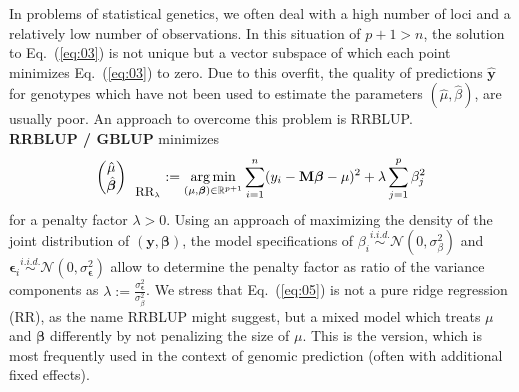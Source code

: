 \documentclass{bmcart}
\newcommand{\bb}{\bm{\beta}}
\DeclareMathOperator*{\argmin}{arg\,min}
\newcommand{\M}{\mathbf{M}}
\newcommand{\0}{\mathbf{0}}
\begin{document}
In problems of statistical genetics, we often deal with a high number of loci and a relatively low number of observations.
In this situation of $p + 1 > n$, the solution to Eq.~(\ref{eq:03}) is not unique but a vector subspace of which each point minimizes Eq.~(\ref{eq:03}) to zero.
Due to this overfit, the quality of predictions $\hat{\mathbf{y}}$ for genotypes which have not been used to estimate the parameters $(\hat{\mu},\hat{\beta})$, are usually poor. An approach to overcome this problem is RRBLUP.
\vspace{0.4cm}\\
{\bf RRBLUP / GBLUP} minimizes 
\begin{equation}\label{eq:05}
	\begin{pmatrix}
		\hat{\mu} \\
		\hat{\bm{\beta}}
	\end{pmatrix}_{\mbox{\small RR}_\lambda} :=\argmin_{(\mu,\bm{\beta}) \in \mathbb{R}^{p+1}} \sum\limits_{i=1}^n (y_i - \M\bm{\beta} - \mu)^2  + \lambda \sum\limits_{j=1}^p {\beta}_j^2
\end{equation}
for a penalty factor $\lambda > 0$. Using an approach of maximizing the density of the joint distribution of $(\mathbf{y},\bm{\beta})$, the model specifications of ${\beta_i}\stackrel{i.i.d.}{\sim} \mathcal{N}(0,\sigma_\beta^2)$ and ${\bm{\epsilon}_i}\stackrel{i.i.d.}{\sim} \mathcal{N}(0,\sigma_{\bm{\epsilon}}^2)$ allow to determine the penalty factor as ratio of the variance components  as $\lambda := \frac{\sigma_{\bm{\epsilon}}^2}{\sigma_\beta^2}$. We stress that Eq.~(\ref{eq:05}) is not a pure ridge regression (RR), as the name RRBLUP might suggest, but a mixed model which treats $\mu$ and $\bb$ differently by not penalizing the size of $\mu$. This is the version, which is most frequently used in the context of genomic prediction (often with additional fixed effects). \\
\end{document}
